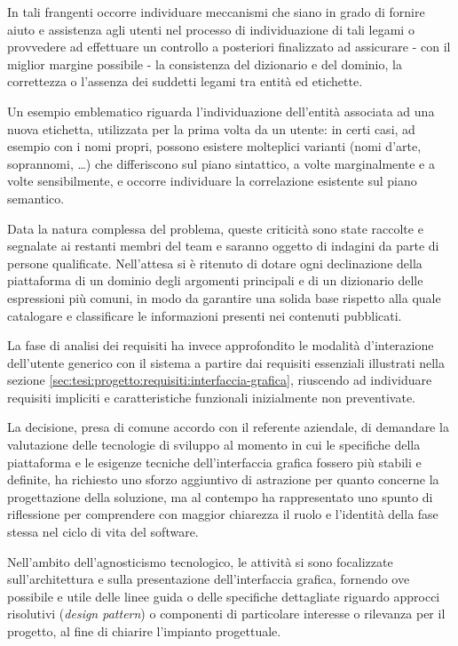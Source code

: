 In tali frangenti occorre individuare meccanismi che siano in grado di fornire aiuto e assistenza agli utenti nel processo di individuazione di tali legami o provvedere ad effettuare un controllo a posteriori finalizzato ad assicurare - con il miglior margine possibile - la consistenza del dizionario e del dominio, la correttezza o l'assenza dei suddetti legami tra entità ed etichette.

Un esempio emblematico riguarda l'individuazione dell'entità associata ad una nuova etichetta, utilizzata per la prima volta da un utente: in certi casi, ad esempio con i nomi propri, possono esistere molteplici varianti (nomi d'arte, soprannomi, \ldots) che differiscono sul piano sintattico, a volte marginalmente e a volte sensibilmente, e occorre individuare la correlazione esistente sul piano semantico.

Data la natura complessa del problema, queste criticità sono state raccolte e segnalate ai restanti membri del team e saranno oggetto di indagini da parte di persone qualificate. Nell'attesa si è ritenuto di dotare ogni declinazione della piattaforma di un dominio degli argomenti principali e di un dizionario delle espressioni più comuni, in modo da garantire una solida base rispetto alla quale catalogare e classificare le informazioni presenti nei contenuti pubblicati.  

La fase di analisi dei requisiti ha invece approfondito le modalità d'interazione dell'utente generico con il sistema a partire dai requisiti essenziali illustrati nella sezione \ref{sec:tesi:progetto:requisiti:interfaccia-grafica}, riuscendo ad individuare requisiti impliciti e caratteristiche funzionali inizialmente non preventivate.

La decisione, presa di comune accordo con il referente aziendale, di demandare la valutazione delle tecnologie di sviluppo al momento in cui le specifiche della piattaforma e le esigenze tecniche dell'interfaccia grafica fossero più stabili e definite, ha richiesto uno sforzo aggiuntivo di astrazione per quanto concerne la progettazione della soluzione, ma al contempo ha rappresentato uno spunto di riflessione per comprendere con maggior chiarezza il ruolo e l'identità della fase stessa nel ciclo di vita del software.

Nell'ambito dell'agnosticismo tecnologico, le attività si sono focalizzate sull'architettura e sulla presentazione dell'interfaccia grafica, fornendo ove possibile e utile delle linee guida o delle specifiche dettagliate riguardo approcci risolutivi (\textit{design pattern}) o componenti di particolare interesse o rilevanza per il progetto, al fine di chiarire l'impianto progettuale.


